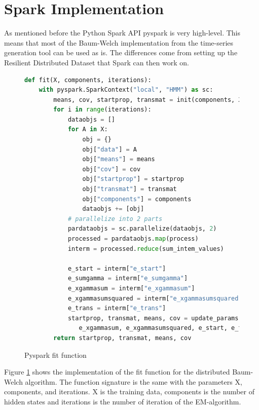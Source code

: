 \section{Spark Implementation}

As mentioned before the Python Spark API pyspark is very high-level. This means that most of the Baum-Welch implementation from the time-series generation tool can be used as is. The differences come from setting up the Resilient Distributed Dataset that Spark can then work on. \parencite{sparkhmm}

\begin{figure}
\begin{singlespace}
\begin{lstlisting}[language=Python]
def fit(X, components, iterations):
    with pyspark.SparkContext("local", "HMM") as sc:
        means, cov, startprop, transmat = init(components, X)
        for i in range(iterations):
            dataobjs = []
            for A in X:
                obj = {}
                obj["data"] = A
                obj["means"] = means
                obj["cov"] = cov
                obj["startprop"] = startprop
                obj["transmat"] = transmat
                obj["components"] = components
                dataobjs += [obj]
            # parallelize into 2 parts
            pardataobjs = sc.parallelize(dataobjs, 2)
            processed = pardataobjs.map(process)
            interm = processed.reduce(sum_intem_values)

            e_start = interm["e_start"]
            e_sumgamma = interm["e_sumgamma"]
            e_xgammasum = interm["e_xgammasum"]
            e_xgammasumsquared = interm["e_xgammasumsquared"]
            e_trans = interm["e_trans"]
            startprop, transmat, means, cov = update_params(e_sumgamma, \
               e_xgammasum, e_xgammasumsquared, e_start, e_trans)
        return startprop, transmat, means, cov
\end{lstlisting}
\end{singlespace}
\caption{Pyspark fit function}    
\label{fig:pyspark-fit-listing}
\end{figure}

Figure \ref{fig:pyspark-fit-listing} shows the implementation of the fit function for the distributed Baum-Welch algorithm. The function signature is the same with the parameters X, components, and iterations. X is the training data, components is the number of hidden states and iterations is the number of iteration of the EM-algorithm. 

